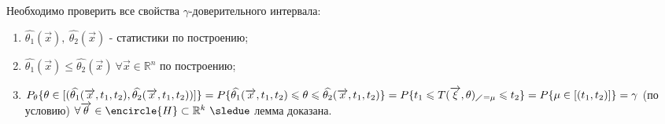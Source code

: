 \begin{lemma}
  \begin{dokvo}
      Необходимо проверить все свойства $\gamma$-доверительного интервала:
      \begin{enumerate}
        \item $\widehat{\theta_1}(\overrightarrow{x}), \ \widehat{\theta_2}(\overrightarrow{x})$ - статистики по построению;
        \item $\widehat{\theta_1}(\overrightarrow{x}) \leqslant \widehat{\theta_2}(\overrightarrow{x}) \ \forall \overrightarrow{x} \in \mathbb{R}^n$ по построению;
        \item $P_{\theta}\{\theta \in [(\widehat{\theta_1}(\overrightarrow{x},t_1,t_2),\widehat{\theta_2}(\overrightarrow{x},t_1,t_2))]\} =
        P\{\widehat{\theta_1}(\overrightarrow{x},t_1,t_2) \leqslant \theta \leqslant \widehat{\theta_2}(\overrightarrow{x},t_1,t_2)\} =
        P\{t_1 \leqslant T(\overrightarrow{\xi}, \theta)_{\diagup = \mu} \leqslant t_2\} =
        P\{\mu \in [(t_1,t_2)]\} = \gamma$ (по условию) $\forall \overrightarrow{\theta} \in \encircle{H} \subset \mathbb{R}^k \ \sledue$ лемма доказана.
      \end{enumerate}
  \end{dokvo}
\end{lemma}
\newpage
